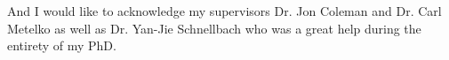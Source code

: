 
\begin{acknowledgements}      


And I would like to acknowledge my supervisors Dr. Jon Coleman and Dr. Carl Metelko as well as Dr. Yan-Jie Schnellbach who was a great help during the entirety of my PhD. 


\end{acknowledgements}
